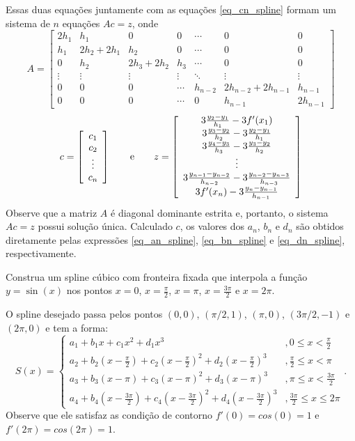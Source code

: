 Essas duas equações juntamente com as equações \eqref{eq_cn_spline} formam um sistema de $n$ equações $Ac = z$, onde
\begin{equation*}
A=\left[\begin{array}{ccccccc}
2h_1 &h_1&0&0 &\cdots&0&0\\
h_1&2h_2+2h_{1}&h_2&0&\cdots&0&0\\
0&h_2&2h_3+2h_{2}&h_3&\cdots&0&0\\
\vdots&\vdots&\vdots&\vdots&\ddots&\vdots&\vdots\\
0&0&0&\cdots&h_{n-2} & 2h_{n-2}+2h_{n-1}&h_{n-1}\\
0&0&0&\cdots &0&h_{n-1}&2h_{n-1}
\end{array}\right]  
\end{equation*}  
\begin{equation*}
c = \left[\begin{array}{c}
c_1\\
c_2\\
\vdots\\
c_n
\end{array}\right]\qquad \hbox{e}\qquad
z = \left[\begin{array}{c}
3\frac{y_{2}-y_1}{h_1}-3f'(x_1)\\
3\frac{y_{3}-y_2}{h_2}-3\frac{y_{2}-y_{1}}{h_{1}}\\
3\frac{y_{4}-y_3}{h_3}-3\frac{y_{3}-y_{2}}{h_{2}}\\
\vdots\\
3\frac{y_{n-1}-y_{n-2}}{h_{n-2}}-3\frac{y_{n-2}-y_{n-3}}{h_{n-3}}\\
3f'(x_n)-3\frac{y_{n}-y_{n-1}}{h_{n-1}}
\end{array}\right]  
\end{equation*}
Observe que a matriz $A$ é diagonal dominante estrita e, portanto, o sistema $Ac = z$ possui solução única. Calculado $c$, os valores dos $a_n$, $b_n$ e $d_n$ são obtidos diretamente pelas expressões \eqref{eq_an_spline}, \eqref{eq_bn_spline} e \eqref{eq_dn_spline}, respectivamente.


\begin{ex}Construa um spline cúbico com fronteira fixada que interpola a função $y=\sin (x)$ nos pontos $x=0$, $x=\frac{\pi}{2}$, $x=\pi$, $x=\frac{3\pi}{2}$ e $x=2\pi$.
\end{ex}
O spline desejado passa pelos pontos $(0,0)$, $(\pi/2,1)$, $(\pi,0)$, $(3\pi/2,-1)$ e $(2\pi,0)$ e tem a forma:
\begin{equation*}
S(x)=\left\{\begin{array}{ll}
a_1+b_1x+c_1x^2+d_1x^3&, 0\leq x<\frac{\pi}{2}\\
a_2+b_2(x-\frac{\pi}{2})+c_2(x-\frac{\pi}{2})^2+d_2(x-\frac{\pi}{2})^3&, \frac{\pi}{2}\leq x<\pi\\
a_3+b_3(x-\pi)+c_3(x-\pi)^2+d_3(x-\pi)^3&, \pi\leq x<\frac{3\pi}{2}\\
a_4+b_4(x-\frac{3\pi}{2})+c_4(x-\frac{3\pi}{2})^2+d_4(x-\frac{3\pi}{2})^3&, \frac{3\pi}{2}\leq x\leq 2\pi
\end{array}\right..  
\end{equation*}
Observe que ele satisfaz as condição de contorno $f'(0)=cos(0)=1$ e $f'(2\pi)=cos(2\pi)=1$.

